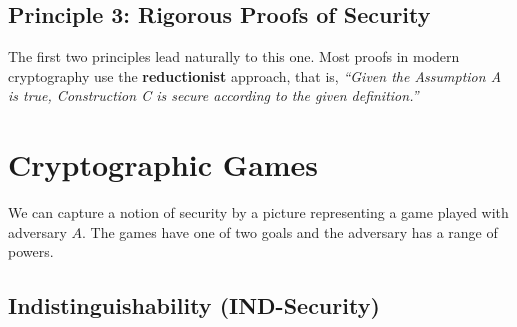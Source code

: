 \subsection{Principle 3: Rigorous Proofs of Security}

The first two principles lead naturally to this one. Most proofs in modern cryptography use the \textbf{reductionist} approach, that is, \textit{``Given the Assumption A is true, Construction C is secure according to the given definition.''}

\section{Cryptographic Games}

We can capture a notion of security by a picture representing a game played with adversary $A$. The games have one of two goals and the adversary has a range of powers.

\subsection{Indistinguishability (IND-Security)}

